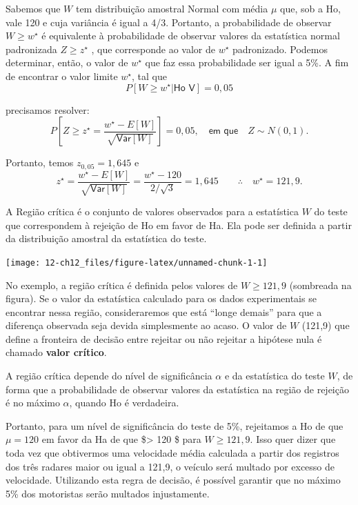 \documentclass[
]{book}
\theoremstyle{definition}
\theoremstyle{definition}
\theoremstyle{definition}
\theoremstyle{remark}
\begin{document}
Sabemos que \(W\) tem distribuição amostral Normal com média \(\mu\) que, sob a Ho, vale 120 e cuja variância é igual a 4/3. Portanto, a probabilidade de observar \(W ≥ w^\star\) é equivalente à probabilidade de observar valores da estatística normal padronizada \(Z ≥ z^\star\) , que corresponde ao valor de \(w^\star\) padronizado. Podemos determinar, então, o valor de \(w^\star\) que faz essa probabilidade ser igual a 5\%. A fim de encontrar o valor limite \(w^\star\), tal que
\[P[W \geq w^\star | \textsf{Ho V}] = 0,05\]

precisamos resolver:
\[P\left[ Z \geq z^\star = \frac{w^\star - E[W]}{\sqrt{\textsf{Var}[W]}}\right] = 0,05,
  \quad \textsf{em que} \quad Z \sim N(0,1).\]

Portanto, temos \(z_{0,05} = 1,645\) e
\[z^\star = \frac{w^\star - E[W]}{\sqrt{\textsf{Var}[W]}} = \frac{w^\star - 120}{2/\sqrt{3}} = 1,645 
  \qquad \therefore \quad
  w^\star = 121,9.\]

A Região crítica é o conjunto de valores observados para a estatística \(W\) do teste
que correspondem à rejeição de Ho em favor de Ha. Ela pode ser definida a partir da distribuição amostral da estatística do teste.

\texttt{[image: 12-ch12\_files/figure-latex/unnamed-chunk-1-1]}

No exemplo, a região crítica é definida pelos valores de \(W \geq 121,9\) (sombreada na figura). Se o valor da estatística calculado para os dados experimentais se encontrar nessa região, consideraremos que está ``longe demais'' para que a diferença observada seja devida simplesmente ao acaso. O valor de \(W\) (121,9) que define a fronteira de decisão entre rejeitar ou não rejeitar a hipótese nula é chamado \textbf{valor crítico}.

A região crítica depende do nível de significância \(\alpha\) e da estatística do teste \(W\),
de forma que a probabilidade de observar valores da estatística na região de rejeição é no máximo \(\alpha\), quando Ho é verdadeira.

Portanto, para um nível de significância do teste de 5\%, rejeitamos a Ho de que \(\mu= 120\) em favor da Ha de que \$\mu \textgreater{} 120 \$ para \(W ≥ 121,9\). Isso quer dizer que toda vez que obtivermos uma velocidade média calculada a partir dos registros dos três radares maior ou igual a 121,9, o veículo será multado por excesso de velocidade. Utilizando esta regra de decisão, é possível garantir que no máximo 5\% dos motoristas serão multados injustamente.
\end{document}
